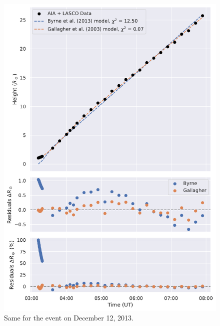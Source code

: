 \begin{figure}[!htp]
	\centering
	\includegraphics[width=0.8\hsize]{chapter2/figs/appendix/height_profile_residuals_aia_lasco_131212_01.pdf}
	\caption{Same for the event on December 12, 2013.}
\end{figure}

